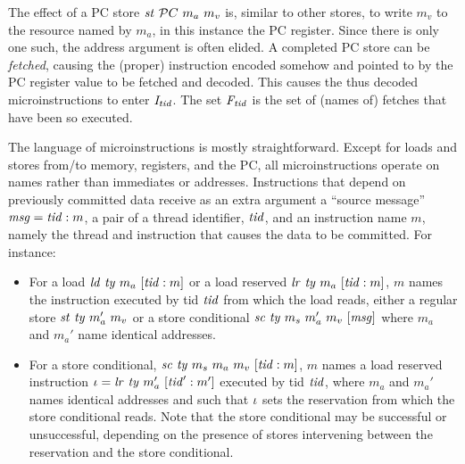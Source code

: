 The effect of a PC store $\mathit{st}\ \mathcal PC\ m_a\ m_v$ is, similar to other stores, to write $m_v$ to the resource named by $m_a$, in this instance the PC register. Since there is only one such, the address argument is often elided. A completed PC store can be \emph{fetched}, causing the (proper) instruction encoded somehow and pointed to by the PC register value to be fetched and decoded. This causes the thus decoded microinstructions to enter $\mathit{I}_{\mathit{tid}}$. The set $\mathit{F}_{\mathit{tid}}$ is the set of (names of) fetches that have been so executed.



The language of microinstructions is mostly straightforward. Except for loads and stores from/to memory, registers, and the PC, all microinstructions operate on names rather than immediates or addresses. Instructions that depend on previously committed data receive as an extra argument a ``source message'' $\mathit{msg}=\mathit{tid}:m$, a pair of a thread identifier, $\mathit{tid}$, and an instruction name $m$, namely the thread and instruction that causes the data to be committed. For instance:
\begin{itemize}
\item For a load $\mathit{ld}\ \mathit{ty}\ m_a\ [\mathit{tid}:m]$ or a
load reserved $\mathit{lr}\ \mathit{ty}\ m_a\ [\mathit{tid}:m]$, $m$ names the instruction executed by tid $\mathit{tid}$ from which the load reads, either a regular store $\mathit{st}\ \mathit{ty}\ m_a'\ m_v$ or a store conditional $\mathit{sc}\ \mathit{ty}\ m_s\ m_a'\ m_v\ [\mathit{msg}]$ where
$m_a$ and $m_a'$ name identical addresses.
\item For a store conditional, $\mathit{sc}\ \mathit{ty}\ m_s\ m_a\ m_v\ [\mathit{tid}:m]$,
$m$ names a load reserved instruction $\iota = \mathit{lr}\ \mathit{ty}\ m_a'\ [\mathit{tid}':m']$ executed by tid $\mathit{tid}$,
where $m_a$ and $m_a'$ names identical addresses and such that $\iota$ sets the reservation from which the store conditional reads. Note that the store conditional may be successful or unsuccessful, depending on the presence of stores intervening between the reservation and the store conditional.
\end{itemize}



\HERTIL

